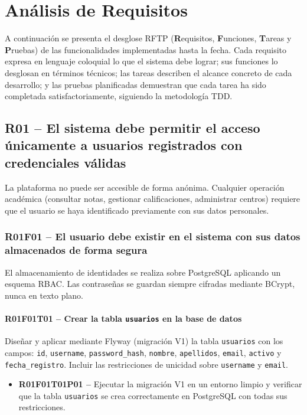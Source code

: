 \documentclass[12pt, a4paper]{report}
\begin{document}

\chapter{Análisis de Requisitos}

A continuación se presenta el desglose RFTP (\textbf{R}equisitos, \textbf{F}unciones, \textbf{T}areas y \textbf{P}ruebas) de las funcionalidades implementadas hasta la fecha. Cada requisito expresa en lenguaje coloquial lo que el sistema debe lograr; sus funciones lo desglosan en términos técnicos; las tareas describen el alcance concreto de cada desarrollo; y las pruebas planificadas demuestran que cada tarea ha sido completada satisfactoriamente, siguiendo la metodología TDD.

\section{R01 -- El sistema debe permitir el acceso únicamente a usuarios registrados con credenciales válidas}

La plataforma no puede ser accesible de forma anónima. Cualquier operación académica (consultar notas, gestionar calificaciones, administrar centros) requiere que el usuario se haya identificado previamente con sus datos personales.

\subsection{R01F01 -- El usuario debe existir en el sistema con sus datos almacenados de forma segura}

El almacenamiento de identidades se realiza sobre PostgreSQL aplicando un esquema RBAC. Las contraseñas se guardan siempre cifradas mediante BCrypt, nunca en texto plano.

\subsubsection{R01F01T01 -- Crear la tabla \texttt{usuarios} en la base de datos}
Diseñar y aplicar mediante Flyway (migración V1) la tabla \texttt{usuarios} con los campos: \texttt{id}, \texttt{username}, \texttt{password\_hash}, \texttt{nombre}, \texttt{apellidos}, \texttt{email}, \texttt{activo} y \texttt{fecha\_registro}. Incluir las restricciones de unicidad sobre \texttt{username} y \texttt{email}.
\begin{itemize}
  \item \textbf{R01F01T01P01 --} Ejecutar la migración V1 en un entorno limpio y verificar que la tabla \texttt{usuarios} se crea correctamente en PostgreSQL con todas sus restricciones.
\end{itemize}
\end{document}
